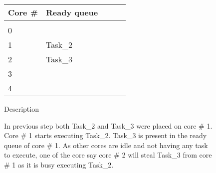 \documentclass{article}
\begin{document}
\begin{figure}
\begin{minipage}{1.0\linewidth}
\begin{tabular}{l | l l l l}
Core \# & Ready queue\\
\hline
&\\
0 & & & &\\
1 & Task\_2 & & &\\
2 & Task\_3 & & &\\
3 & & & &\\
4 & & & &\\
\end{tabular}
\end{minipage}


\begin{minipage}{1.0\linewidth}
Description

In previous step both Task\_2 and Task\_3 were placed on core \# 1. Core \# 1 starts executing Task\_2. Task\_3 is present in the ready queue of core \# 1. As other cores are idle and not having any task to execute, one of the core    say core \# 2 will steal Task\_3 from core \# 1 as it is busy executing Task\_2.

\begin{verbatim}






\end{verbatim}
\end{minipage}

\end{figure}
\end{document}

